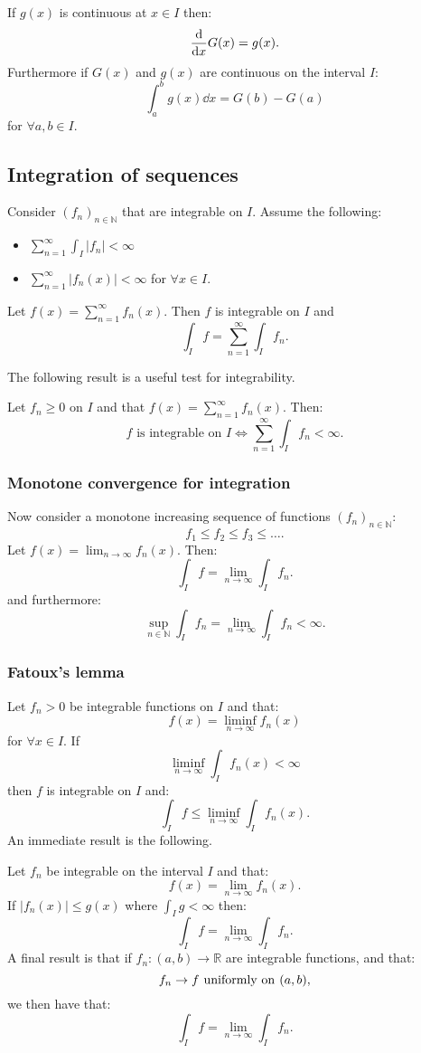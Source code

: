 \documentclass{article}
\begin{document}
If $g(x)$ is continuous at $x\in I$ then:
$$\dv{x} G(x)=g(x).$$
Furthermore if $G(x)$ and $g(x)$ are continuous on the interval $I$:
$$\int_{a}^{b}g(x)\dd x=G(b)-G(a)$$
for $\forall a,b\in I$.

\subsection{Integration of sequences}
Consider $(f_n)_{n\in\mathbb{N}}$ that are integrable on $I$. Assume the following:
\begin{itemize}
    \item $\displaystyle\sum_{n=1}^{\infty}
    \int_I |f_n|<\infty$
    \item $\displaystyle\sum_{n=1}^{\infty}
    |f_n(x)|<\infty$ for $\forall x\in I$.
\end{itemize}
Let $f(x)=\displaystyle\sum_{n=1}^{\infty}f_n(x)$.
Then $f$ is integrable on $I$ and
$$\int_I f=\sum_{n=1}^{\infty}\int_I f_n.$$

\newpage

The following result is a useful test for integrability.

Let $f_n\geq0$ on $I$ and that
$f(x)=\displaystyle\sum_{n=1}^{\infty}f_n(x)$. Then:
$$\text{$f$ is integrable on $I$}
\iff\sum_{n=1}^{\infty}\int_I f_n<\infty.$$

\subsubsection{Monotone convergence for integration}
Now consider a monotone increasing sequence of functions $(f_n)_{n\in\mathbb{N}}$:
$$f_1\leq f_2\leq f_3\leq\dots.$$
Let $f(x)=\displaystyle\lim_{n\rightarrow\infty}f_n(x)$. Then:
$$\int_I f=\lim_{n\rightarrow\infty}\int_I f_n.$$
and furthermore:
$$\sup_{n\in\mathbb{N}}\int_I f_n
=\lim_{n\rightarrow\infty}\int_I f_n <\infty.$$

\subsubsection{Fatoux's lemma}
Let $f_n>0$ be integrable functions on $I$ and that:
$$f(x)=\liminf_{n\rightarrow\infty} f_n(x)$$
for $\forall x\in I$. If
$$\liminf_{n\rightarrow\infty}\int_I f_n(x)<\infty$$
then $f$ is integrable on $I$ and:
$$\int_I f\leq
\liminf_{n\rightarrow\infty}\int_I f_n(x).$$
An immediate result is the following. 

Let $f_n$ be integrable on the interval $I$ and that:
$$f(x)=\lim_{n\rightarrow\infty}f_n(x).$$
If $|f_n(x)|\leq g(x)$ where $\displaystyle\int_I g<\infty$ then:
$$\int_I f=\lim_{n\rightarrow\infty}\int_I f_n.$$
A final result is that if $f_n:(a,b)\rightarrow\mathbb{R}$ are integrable functions, and that:
$$f_n\rightarrow f\hspace{0.05in}\text{uniformly on}\hspace{0.05in}(a,b),$$
we then have that:
$$\int_I f=\lim_{n\rightarrow\infty}\int_I f_n.$$
\end{document}
